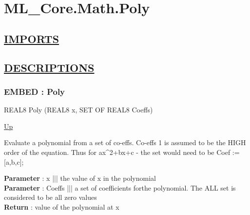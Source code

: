 \chapter*{ML\_Core.Math.Poly}
\hypertarget{ecldoc:toc:ML_Core.Math.Poly}{}

\section*{\underline{IMPORTS}}

\section*{\underline{DESCRIPTIONS}}
\subsection*{EMBED : Poly}
\hypertarget{ecldoc:ml_core.math.poly}{}
\begin{minipage}[t]{\textwidth}
\begin{flushleft}
REAL8 Poly (REAL8 x, SET OF REAL8 Coeffs)
\end{flushleft}
\end{minipage}
\hyperlink{ecldoc:toc:ML_Core/Math}{Up}

\par
Evaluate a polynomial from a set of co-effs. Co-effs 1 is assumed to be the HIGH order of the equation. Thus for ax\^{}2+bx+c - the set would need to be Coef := [a,b,c];
\par
\textbf{Parameter} : x ||| the value of x in the polynomial \\
\textbf{Parameter} : Coeffs ||| a set of coefficients forthe polynomial. The ALL set is considered to be all zero values \\
\textbf{Return} : value of the polynomial at x \\
